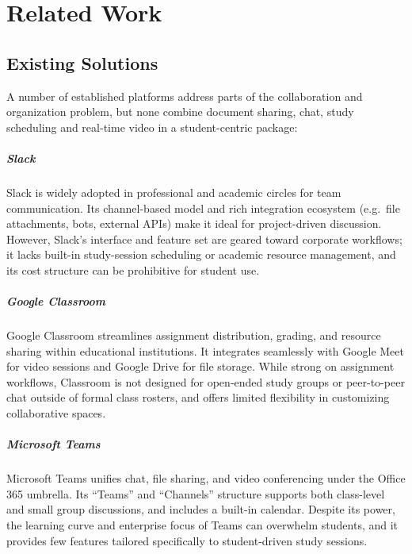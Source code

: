 \chapter{Related Work}\label{chapter:chap2}

\section{Existing Solutions}

A number of established platforms address parts of the collaboration and organization problem, but none combine document sharing, chat, study scheduling and real-time video in a student-centric package:

\paragraph{Slack}\cite{Slack}  
Slack is widely adopted in professional and academic circles for team communication.  Its channel-based model and rich integration ecosystem (e.g.\ file attachments, bots, external APIs\cite{API}) make it ideal for project-driven discussion.  However, Slack’s interface and feature set are geared toward corporate workflows; it lacks built-in study-session scheduling or academic resource management, and its cost structure can be prohibitive for student use.

\paragraph{Google Classroom}\cite{Classroom}  
Google Classroom streamlines assignment distribution, grading, and resource sharing within educational institutions.  It integrates seamlessly with Google Meet for video sessions and Google Drive for file storage.  While strong on assignment workflows, Classroom is not designed for open‐ended study groups or peer-to-peer chat outside of formal class rosters, and offers limited flexibility in customizing collaborative spaces.

\paragraph{Microsoft Teams}\cite{Teams}  
Microsoft Teams unifies chat, file sharing, and video conferencing under the Office 365 umbrella.  Its “Teams” and “Channels” structure supports both class-level and small group discussions, and includes a built-in calendar.  Despite its power, the learning curve and enterprise focus of Teams can overwhelm students, and it provides few features tailored specifically to student-driven study sessions.

